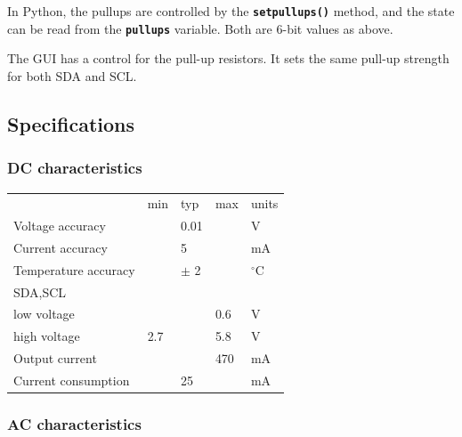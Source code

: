 \documentclass{article}
\newcommand{\degc}{$^{\circ}$C}
\newcommand{\heavyline}{\specialrule{1pt}{1pt}{1pt}}
\newcommand{\mach}[1]{\texttt{\textbf{#1}}}
\begin{document}
In Python, the pullups are controlled by the \mach{setpullups()} method, and the state can be read from the \mach{pullups} variable.
Both are 6-bit values as above.

The GUI has a control for the pull-up resistors.
It sets the same pull-up strength for both SDA and SCL.

\newpage
\hypertarget{technical-specifications}{}
\hypertarget{technical-specifications}{%
\subsection{Specifications}\label{electrical-characteristics}}

\subsubsection*{DC characteristics}
\vspace{10 pt}
{\renewcommand{\arraystretch}{1.2}%

\begin{tabularx}{\linewidth}{XC{40pt}C{40pt}C{40pt}C{40pt}}
\heavyline
& min & typ & max & units \\ \heavyline

Voltage accuracy              && 0.01 && V            \\ \hline
Current accuracy              && 5 && mA              \\ \hline
Temperature accuracy          && $\pm$ 2 && \degc            \\ \hline
SDA,SCL & & & & \\
\hspace{10pt}low voltage & & & 0.6 & V \\
\hspace{10pt}high voltage & 2.7 &   & 5.8 & V \\ \hline
Output current        & & & 470 & mA                  \\ \hline
Current consumption   & & 25 & & mA                   \\ \hline

\end{tabularx}}
\vspace{10 pt}

\subsubsection*{AC characteristics}
\vspace{10 pt}
\end{document}
